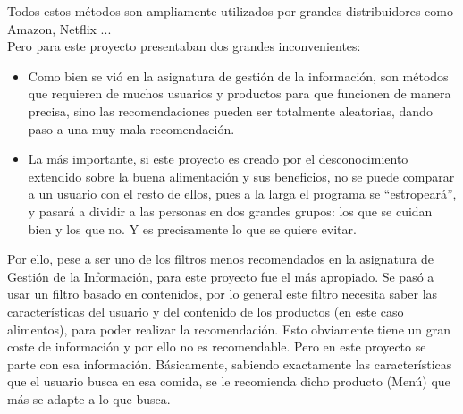 Todos estos métodos son ampliamente utilizados por grandes distribuidores como Amazon, Netflix ...\\
Pero para este proyecto presentaban dos grandes inconvenientes:
\begin{itemize}
\item	Como bien se vió en la asignatura de gestión de la información, son métodos que requieren de muchos usuarios y productos para que funcionen de manera precisa, sino las recomendaciones pueden ser totalmente aleatorias, dando paso a una muy mala recomendación.
\item	La más importante, si este proyecto es creado por el desconocimiento extendido sobre la buena alimentación y sus beneficios, no se puede comparar a un usuario con el resto de ellos, pues a la larga el programa se “estropeará”, y pasará a dividir a las personas en dos grandes grupos: los que se cuidan bien y los que no. Y es precisamente lo que se quiere evitar.
\end{itemize}

Por ello, pese a ser uno de los filtros menos recomendados en la asignatura de Gestión de la Información,  para este proyecto fue el más apropiado. Se pasó a usar un filtro basado en contenidos, por lo general este filtro necesita saber las características del usuario y del contenido de los productos (en este caso alimentos), para poder realizar la recomendación. Esto obviamente tiene un gran coste de información y por ello no es recomendable. Pero en este proyecto se parte con esa información. Básicamente, sabiendo exactamente las características que el usuario busca en esa comida, se le recomienda dicho producto (Menú) que más se adapte a lo que busca.


